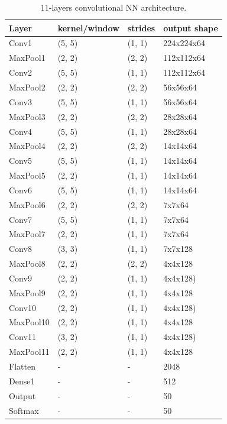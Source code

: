 \documentclass[a4paper]{article}
\begin{document}
\begin{table}[!h]
    \caption{11-layers convolutional NN architecture.
    \label{table:layers11}
    }
\begin{center}
    \begin{tabular}{| l | l | l | l |}
    \hline
        Layer & kernel/window& strides & output shape\\
    \hline
        Conv1  & (5, 5)&        (1, 1)&     224x224x64  \\
    \hline
        MaxPool1 & (2, 2)&      (2, 2)&     112x112x64  \\
        Conv2  & (5, 5)&        (1, 1)&     112x112x64  \\
    \hline
        MaxPool2 & (2, 2)&      (2, 2)&     56x56x64    \\
        Conv3  & (5, 5)&        (1, 1)&     56x56x64    \\
    \hline
        MaxPool3 & (2, 2)&      (2, 2)&     28x28x64    \\
        Conv4  & (5, 5)&        (1, 1)&     28x28x64  \\
    \hline
        MaxPool4 & (2, 2)&      (2, 2)&     14x14x64  \\
        Conv5  & (5, 5)&        (1, 1)&     14x14x64  \\ %
    \hline
        MaxPool5 & (2, 2)&      (1, 1)&     14x14x64  \\
        Conv6  & (5, 5)&        (1, 1)&     14x14x64  \\
    \hline
        MaxPool6 & (2, 2)&      (2, 2)&     7x7x64  \\
        Conv7  & (5, 5)&        (1, 1)&     7x7x64  \\  %
    \hline
        MaxPool7 & (2, 2)&      (1, 1)&     7x7x64  \\
        Conv8  & (3, 3)&        (1, 1)&     7x7x128\\
    \hline
        MaxPool8 & (2, 2)&      (2, 2)&     4x4x128  \\
        Conv9  & (2, 2)&        (1, 1)&     4x4x128)\\
    \hline
        MaxPool9 & (2, 2)&      (1, 1)&     4x4x128  \\
        Conv10 & (2, 2)&        (1, 1)&     4x4x128)\\  %
    \hline
        MaxPool10 & (2, 2)&      (1, 1)&     4x4x128  \\
        Conv11 & (3, 2)&        (1, 1)&     4x4x128)\\  %
    \hline
        MaxPool11 & (2, 2)&      (1, 1)&     4x4x128  \\
        Flatten & - & - & 2048 \\
        Dense1 & - & - & 512 \\
    \hline
        Output & - & - & 50 \\
        Softmax & - & - & 50 \\
    \hline
    \end{tabular}
\end{center}
\end{table}
\end{document}
